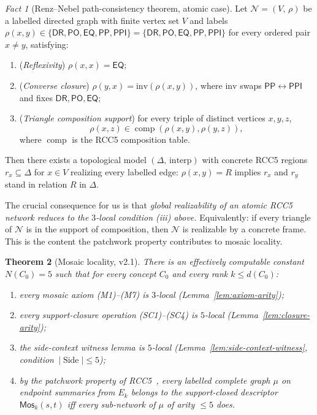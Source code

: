 \documentclass[11pt]{article}
\newtheorem{theorem}{Theorem}[section]
\theoremstyle{definition}
\theoremstyle{remark}
\newtheorem{fact}[theorem]{Fact}
\newcommand{\DR}{\mathsf{DR}}
\newcommand{\PO}{\mathsf{PO}}
\newcommand{\PP}{\mathsf{PP}}
\newcommand{\PPI}{\mathsf{PPI}}
\newcommand{\EQ}{\mathsf{EQ}}
\newcommand{\Base}{\{\DR,\PO,\EQ,\PP,\PPI\}}
\newcommand{\comp}{\operatorname{comp}}
\newcommand{\Mos}{\mathsf{Mos}}
\newcommand{\Side}{\operatorname{Side}}
\begin{document}
\begin{fact}[Renz--Nebel path-consistency theorem, atomic case]
\label{fact:renz-nebel}
Let $\mathcal{N} = (V,\,\rho)$ be a labelled directed graph with
finite vertex set $V$ and labels $\rho(x,y) \in
\Base = \{\DR,\PO,\EQ,\PP,\PPI\}$ for every ordered pair $x\ne y$,
satisfying:
\begin{enumerate}[label=(\roman*),leftmargin=2em]
\item (\emph{Reflexivity}) $\rho(x,x) = \EQ$;
\item (\emph{Converse closure}) $\rho(y,x) = \mathrm{inv}(\rho(x,y))$,
  where $\mathrm{inv}$ swaps $\PP\leftrightarrow\PPI$ and fixes
  $\DR,\PO,\EQ$;
\item (\emph{Triangle composition support}) for every triple of
  distinct vertices $x,y,z$,
  \[\rho(x,z) \in \comp(\rho(x,y),\rho(y,z)),\]
  where $\comp$ is the RCC5 composition table.
\end{enumerate}
Then there exists a topological model $(\Delta,\,\mathrm{interp})$
with concrete RCC5 regions $r_x \subseteq \Delta$ for $x\in V$
realizing every labelled edge: $\rho(x,y) = R$ implies $r_x$ and
$r_y$ stand in relation $R$ in $\Delta$.
\end{fact}

\noindent
The crucial consequence for us is that \emph{global realizability of
an atomic RCC5 network reduces to the $3$-local condition (iii)
above.}  Equivalently: if every triangle of $\mathcal{N}$ is in the
support of composition, then $\mathcal{N}$ is realizable by a
concrete frame.  This is the content the patchwork property
contributes to mosaic locality.

\begin{theorem}[Mosaic locality, v2.1]
\label{thm:arity-bound}
There is an effectively computable constant $N(C_0)=5$ such that
for every concept $C_0$ and every rank $k\le d(C_0)$:
\begin{enumerate}[label=(\alph*),leftmargin=2em]
\item every mosaic axiom (M1)--(M7) is $3$-local
  (Lemma~\ref{lem:axiom-arity});
\item every support-closure operation (SC1)--(SC4) is $5$-local
  (Lemma~\ref{lem:closure-arity});
\item the side-context witness lemma is $5$-local
  (Lemma~\ref{lem:side-context-witness}, condition~$|\Side|\le 5$);
\item by the patchwork property of RCC5~\cite{RenzNebel}, every
  labelled complete graph $\mu$ on endpoint summaries from $E_k$
  belongs to the support-closed descriptor $\Mos_k(s,t)$ iff every
  sub-network of $\mu$ of arity $\le 5$ does.
\end{enumerate}
\end{theorem}
\end{document}
